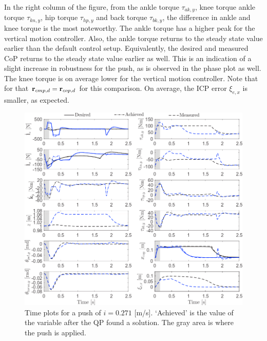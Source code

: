 In the right column of the figure, from the ankle torque $\tau_{ak,y}$, knee torque ankle torque $\tau_{kn,y}$, hip torque $\tau_{hp,y}$ and back torque $\tau_{bk,y}$, the difference in ankle and knee torque is the most noteworthy. The ankle torque has a higher peak for the vertical motion controller. Also, the ankle torque returns to the steady state value earlier than the default control setup. Equivalently, the desired and measured \ac{CoP} returns to the steady state value earlier as well. This is an indication of a slight increase in robustness for the push, as is observed in the phase plot as well. The knee torque is on average lower for the vertical motion controller. Note that for that $\mathbf{r}_{cmp,d}=\mathbf{r}_{cop,d}$ for this comparison. On average, the \ac{ICP} error $\xi_{e,x}$ is smaller, as expected.
\begin{figure}
\centering
\includegraphics[width=1.0\textwidth]{STYLESTUFF/valcomparetime.png}
\caption{Time plots for a push of $i=0.271$ [m/s]. `Achieved' is the value of the variable after the \ac{QP} found a solution. The gray area is where the push is applied.}
\label{fig:valcomparetime}
\end{figure}

